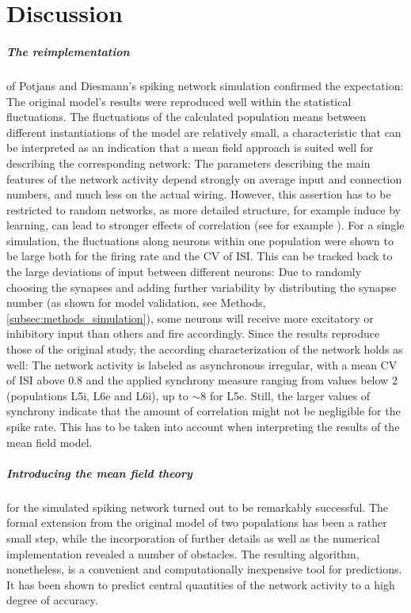 \chapter{Discussion}
\label{sec:discussion}

\paragraph{The reimplementation} of Potjans and Diesmann's spiking network simulation  
confirmed the expectation: The original model's results were reproduced 
well within the statistical fluctuations. The fluctuations of the calculated population 
means between different instantiations of the model are 
relatively small, a characteristic that can be interpreted as an indication that a mean 
field approach is suited well for describing the corresponding network:
The parameters describing the main features of the network activity
depend strongly on average input and connection numbers,
and much less on the actual wiring.
However, this assertion has to be restricted to 
random networks, as more detailed structure, for example induce by learning, 
can lead to stronger effects of correlation (see for example ).
For a single simulation, the fluctuations along neurons within one population
were shown to be large both for the firing rate and the 
CV of ISI. This can be tracked back to the large deviations of input between 
different neurons: Due to randomly choosing the synapses and adding further 
variability by distributing the synapse number (as shown for model validation, 
see Methods, \autoref{subsec:methods_simulation}), 
some neurons will receive more excitatory or inhibitory input than others 
and fire accordingly. 
Since the results reproduce those of the original study, the according characterization 
of the network holds as well: The network activity is labeled as asynchronous irregular, 
with a mean CV of ISI above 0.8 and the applied synchrony measure ranging from 
values below $2$ (populations L5i, L6e and L6i), up to $\sim 8$ for L5e.
Still, the larger values of synchrony indicate that the amount of correlation
might not be negligible for the spike rate. This has to be taken 
into account when interpreting the results of the mean field model. 

\paragraph{Introducing the mean field theory} for the simulated spiking network 
turned out to be remarkably successful. 
The formal extension 
from the original model of two populations has been a rather small step, 
while the incorporation of further details as well as the numerical implementation 
revealed a number of obstacles. The resulting
algorithm, nonetheless, is a convenient and computationally inexpensive tool for 
predictions. It has been shown to predict central quantities 
of the network activity to a high degree of accuracy.  

